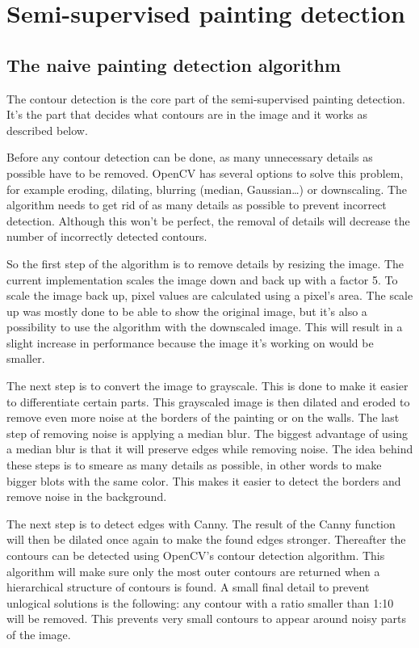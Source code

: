 \section{Semi-supervised painting detection}
\label{sec:assignment1}

\subsection{The naive painting detection algorithm}
\label{subsec:contour_detection}

The contour detection is the core part of the semi-supervised painting detection. It's the part that decides what contours are in the image and it works as described below.

Before any contour detection can be done, as many unnecessary details as possible have to be removed. OpenCV has several options to solve this problem, for example eroding, dilating, blurring (median, Gaussian\dots) or downscaling. The algorithm needs to get rid of as many details as possible to prevent incorrect detection. Although this won't be perfect, the removal of details will decrease the number of incorrectly detected contours.

So the first step of the algorithm is to remove details by resizing the image. The current implementation scales the image down and back up with a factor 5. To scale the image back up, pixel values are calculated using a pixel's area. The scale up was mostly done to be able to show the original image, but it's also a possibility to use the algorithm with the downscaled image. This will result in a slight increase in performance because the image it's working on would be smaller.

The next step is to convert the image to grayscale. This is done to make it easier to differentiate certain parts. This grayscaled image is then dilated and eroded to remove even more noise at the borders of the painting or on the walls. The last step of removing noise is applying a median blur. The biggest advantage of using a median blur is that it will preserve edges while removing noise. The idea behind these steps is to smeare as many details as possible, in other words to make bigger blots with the same color. This makes it easier to detect the borders and remove noise in the background.

The next step is to detect edges with Canny. The result of the Canny function will then be dilated once again to make the found edges stronger. Thereafter the contours can be detected using OpenCV's contour detection algorithm. This algorithm will make sure only the most outer contours are returned when a hierarchical structure of contours is found. A small final detail to prevent unlogical solutions is the following: any contour with a ratio smaller than 1:10 will be removed. This prevents very small contours to appear around noisy parts of the image.


